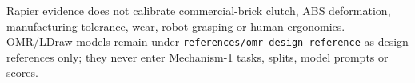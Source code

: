 Rapier evidence does not calibrate commercial-brick clutch, ABS
deformation, manufacturing tolerance, wear, robot grasping or human
ergonomics. OMR/LDraw models remain under
\texttt{references/omr-design-reference} as design references only;
they never enter Mechanism-1 tasks, splits, model prompts or scores.
